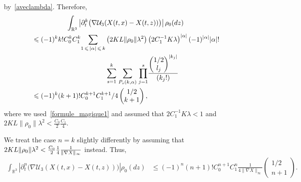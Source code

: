 \documentclass[AHL,Unicode,longabstracts,published]{cedram}
\newcommand{\R}{\mathbb{R}}
\newcommand{\clU}{\mathcal{U}}
\renewcommand{\leq}{\leqslant}
\begin{document}
by~\eqref{aveclambda}. Therefore,
\begin{multline*}
\int_{\R^3} \left|\partial_t^k \big(\nabla \clU_3(X(t,x)-X(t,z))\big) \right| \rho_0(dz)
\\
\begin{aligned}
&\leq (-1)^{k} k!C_0^kC_1^k \underset{1\,\leq\,|\alpha|\,\leq\,k}{\sum} \left(2KL \|\rho_0\| \lambda^2\right) \left(2 C_1^{-1}K\lambda\right)^{|\alpha|} (-1)^{|\alpha|}|\alpha|!\\
&\mkern200mu\underset{s=1}{\overset{k}{\sum}}\;\underset{P_s(k,\alpha)}{\sum}\;\underset{j=1}{\overset{s}{\prod}}\frac{
\begin{pmatrix}
1/2\\ l_j
\end{pmatrix}^{|k_j|} }{\left(k_j!\right)}\\
&\leq (-1)^{k} (k+1)!C_0^{k+1}C_1^{k+1}/4
\begin{pmatrix}
1/2\\ k+1
\end{pmatrix},
\end{aligned}
\end{multline*}
where we used~\eqref{formule_magique1} and assumed that $2 C_1^{-1}K\lambda<1 $ and $2KL \|\rho_0\| \lambda^2<\frac{C_0}{2}\frac{C_1}{4} $.

We treat the case $n=k$ slightly differently by assuming that $2KL \|\rho_0\| \lambda^2\linebreak<\frac{C_0}{2}\frac{1}{4}\frac{1}{\|\nabla X\|_\infty} $ instead. Thus,
\begin{align*}
\int_{\R^3} \left|\partial_t^n \big(\nabla \clU_3(X(t,x)-X(t,z))\big) \right| \rho_0(dz) &\leq (-1)^{n} (n+1)!C_0^{n+1}C_1^{n}\frac{1}{4 \|\nabla X\|_\infty}
\begin{pmatrix}
1/2\\ n+1
\end{pmatrix}.
\end{align*}
\end{document}
